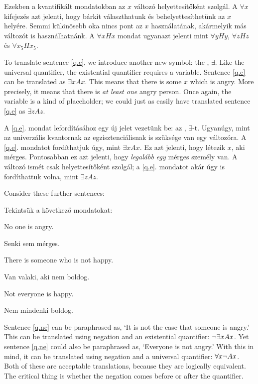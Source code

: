 Ezekben a kvantifikált mondatokban az $x$ változó helyettesítőként szolgál. A $\forall x$ kifejezés azt jelenti, hogy bárkit választhatunk és behelyettesíthetünk az $x$ helyére. Semmi különösebb oka nincs pont az $x$ használatának, akármelyik más változót is használhatnánk. A $\forall x Hx$ mondat ugyanazt jelenti mint $\forall y Hy$, $\forall z Hz$ és $\forall x_5 Hx_5$.

To translate sentence \ref{q.e}, we introduce another new symbol: the , $\exists$. Like the universal quantifier, the existential quantifier requires a variable. Sentence \ref{q.e} can be translated as $\exists x Ax$. This means that there is some $x$ which is angry. More precisely, it means that there is \emph{at least one} angry person. Once again, the variable is a kind of placeholder; we could just as easily have translated sentence \ref{q.e} as $\exists z Az$.

A \ref{q.e}. mondat lefordításához egy új jelet vezetünk be: az , $\exists$-t. Ugyanúgy, mint az univerzális kvantornak az egzisztenciálisnak is szüksége van egy változóra. A \ref{q.e}. mondatot fordíthatjuk úgy, mint $\exists x Ax$. Ez azt jelenti, hogy létezik $x$, aki mérges. Pontosabban ez azt jelenti, hogy \emph{legalább egy} mérges személy van. A változó ismét csak helyettesítőként szolgál; a \ref{q.e}. mondatot akár úgy is fordíthattuk volna, mint $\exists z Az$.

Consider these further sentences:

Tekintsük a következő mondatokat:
\begin{earg}
\item[\ex{q.ne}] No one is angry.
\item[\ex{q.ne}] Senki sem mérges.
\item[\ex{q.en}] There is someone who is not happy.
\item[\ex{q.en}] Van valaki, aki nem boldog.
\item[\ex{q.na}] Not everyone is happy.
\item[\ex{q.na}] Nem mindenki boldog.
\end{earg}

Sentence \ref{q.ne} can be paraphrased as, `It is not the case that someone is angry.' This can be translated using negation and an existential quantifier: $\neg \exists x Ax$. Yet sentence \ref{q.ne} could also be paraphrased as, `Everyone is not angry.' With this in mind, it can be translated using negation and a universal quantifier: $\forall x \neg Ax$. Both of these are acceptable translations, because they are logically equivalent. The critical thing is whether the negation comes before or after the quantifier.

